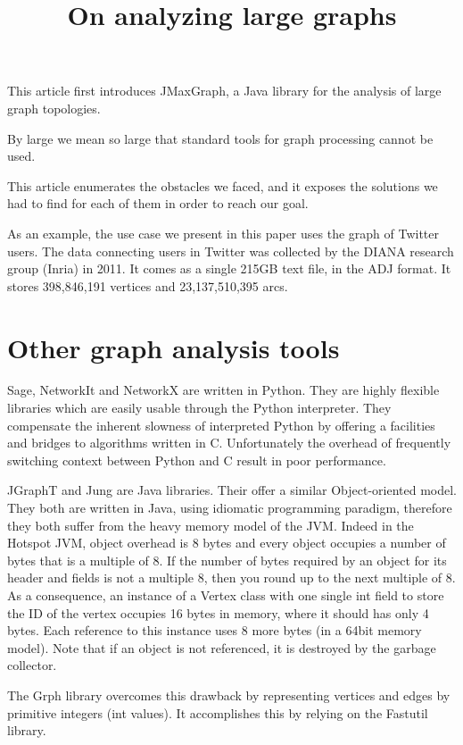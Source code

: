 \documentclass[11pt,a4paper]{article}
\title{On analyzing large graphs}
\author{}
\begin{document}
\maketitle


This article first introduces JMaxGraph, a Java library for the analysis of large graph topologies.

By large we mean so large that standard tools for graph processing cannot be used.

This article enumerates the obstacles we faced, and it exposes the solutions we had
to find for each of them in order to reach our goal.


As an example, the use case we present in this paper uses the graph of Twitter users.
The data connecting users in Twitter was collected by the DIANA research group (Inria) in 2011. It comes as a single 215GB text file, in the ADJ format. It stores 
398,846,191 vertices and 23,137,510,395 arcs.




\section{Other graph analysis tools}

Sage, NetworkIt and NetworkX are written in Python. They are highly flexible libraries which are easily usable through the Python interpreter. They compensate the inherent slowness of interpreted Python by offering a facilities and bridges to algorithms written in C. Unfortunately the overhead of frequently switching context between Python and C result in poor performance.

JGraphT and Jung are Java libraries. Their offer a similar Object-oriented model. They both are written in Java, using idiomatic programming paradigm, therefore they both suffer from  the heavy memory model of the JVM. Indeed in the Hotspot JVM, object overhead is 8 bytes and every object occupies a number of bytes that is a multiple of 8. If the number of bytes required by an object for its header and fields is not a multiple 8, then you round up to the next multiple of 8. As a consequence, an instance of a Vertex class with one single int field to store the ID of the vertex  occupies 16 bytes in memory, where it should has only 4 bytes. Each reference to this instance uses 8 more bytes (in a 64bit memory model). Note that if an object is not referenced, it is destroyed by the garbage collector.

The Grph library overcomes this drawback by representing vertices and edges by primitive integers (int values). It accomplishes this by relying on the Fastutil library. 
\end{document}
